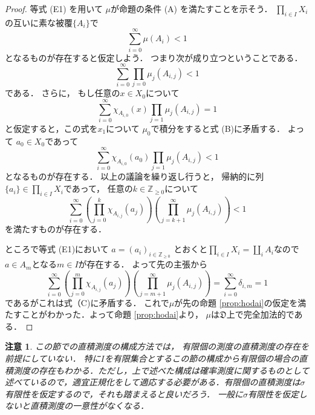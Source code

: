 \documentclass[leqno, a4paper, 12pt]{jsarticle}
\newtheorem*{rmk}{注意}
\newcommand{\zz}{\mathbb{Z}}
\begin{document}
\begin{proof}
等式 (E1) を用いて
$\mu$が命題の条件 (A) を満たすことを示そう．
$\prod_{i\in I}X_{i}$
の互いに素な被覆$\{A_{i}\}$で
\[
\sum_{i=0}^{\infty}\mu(A_{i})<1
\]
となるものが存在すると仮定しよう．
つまり次が成り立つということである．
\begin{equation}
\tag{B}
\sum_{i=0}^{\infty}\prod_{j=0}\mu_{j}(A_{i, j})<1
\end{equation}
である．
さらに，
もし任意の$x\in X_{0}$について
\[
\sum_{i=0}^{\infty}\chi_{A_{i, 0}}(x)
\prod_{j=1}\mu_{j}(A_{i, j})=1
\]
と仮定すると，この式を$x_{1}$について
$\mu_{0}$で積分をすると式 (B)に矛盾する．
よって
$a_{0}\in X_{0}$であって
\[
\sum_{i=0}^{\infty}\chi_{A_{i, 0}}(a_{0})
\prod_{j=1}\mu_{j}(A_{i, j})<1
\]
となるものが存在する．
以上の議論を繰り返し行うと，
帰納的に列$\{a_{i}\}\in \prod_{i\in I}X_{i}$であって，
任意の$k\in \zz_{\ge 0}$について
\begin{equation}
\tag{C}
\sum_{i=0}^{\infty}
\left(\prod_{j=0}^{k}\chi_{A_{i, j}}(a_{j})\right)
\left(\prod_{j=k+1}^{\infty}\mu_{j}(A_{i, j})\right)<1
\end{equation}
を満たすものが存在する．

ところで等式 (E1)において
$a=(a_{i})_{i\in \zz_{\ge 0}}$
とおくと$\prod_{i\in I}X_{i}=\coprod_{i}A_{i}$なので
$a\in A_{m}$となる$m\in I$が存在する．
よって先の主張から
\[
\sum_{i=0}^{\infty}
\left(\prod_{j=0}^{m}\chi_{A_{i, j}}(a_{j})\right)
\left(\prod_{j=m+1}^{\infty}\mu_{j}(A_{i, j})\right)
=\sum_{i=0}^{\infty}\delta_{i, m}=1
\]
であるがこれは式（C)に矛盾する．
これで$\mu$が先の命題 \ref{prop:hodai}の仮定を満たすことがわかった．よって命題 \ref{prop:hodai}より，
$\mu$は$\mathfrak{D}$上で完全加法的である．
\end{proof}

\begin{rmk}
この節での直積測度の構成方法では，
有限個の測度の直積測度の存在を前提にしていない．
特に$I$を有限集合とするこの節の構成から有限個の場合の直積測度の存在もわかる．ただし，上で述べた構成は確率測度に関するものとして述べているので，適宜正規化をして適応する必要がある．有限個の直積測度は$\sigma$有限性を仮定するので，それも踏まえると良いだろう．
一般に$\sigma$有限性を仮定しないと直積測度の一意性がなくなる．
\end{rmk}













\vspace{-20pt}
\end{document}
